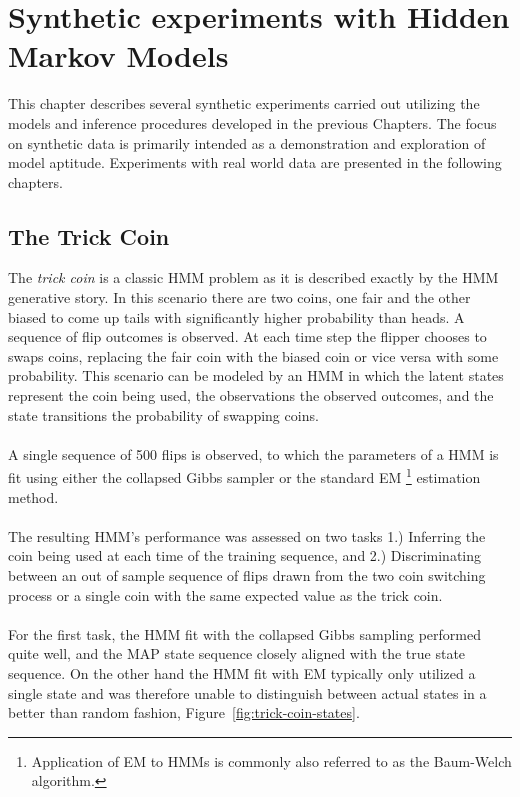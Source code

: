\documentclass[12pt]{report}
\newcommand{\1}[0]{\mathbbm{1}}
\begin{document}
\chapter{Synthetic experiments with Hidden Markov Models}
\label{chap:Synthetic experiments with Hidden Markov Model}
This chapter describes several synthetic experiments carried out utilizing the models and
inference procedures developed in the previous Chapters. The focus on synthetic data
is primarily intended as a demonstration and exploration of model aptitude. Experiments
with real world data are presented in the following chapters.

\section{The Trick Coin}
The \emph{trick coin} is a classic \ac{HMM} problem as it is described exactly
by the \ac{HMM} generative story. In this scenario there are two coins, one fair
and the other biased to come up tails with significantly higher probability than heads.
A sequence of flip outcomes is observed. At each time step the flipper chooses
to swaps coins, replacing the fair coin with the biased coin or vice versa with some probability.
This scenario can be modeled by an \ac{HMM} in which the latent
states represent the coin being used, the observations the observed outcomes, and
the state transitions the probability of swapping coins.
\\\\
A single sequence of 500 flips is observed, to which the parameters of a \ac{HMM} is fit using
either the collapsed Gibbs sampler or the standard \ac{EM}
\footnote{Application of \ac{EM} to \acp{HMM} is commonly also referred to as
the Baum-Welch algorithm.}
estimation method.
\\\\
The resulting \ac{HMM}'s performance was assessed on two tasks 1.) Inferring
the coin being used at each time of the training sequence, and 2.) Discriminating between an
out of sample sequence of flips drawn from the two coin switching process or a single coin with the
same expected value as the trick coin.
\\\\
For the first task, the \ac{HMM} fit with the collapsed Gibbs sampling performed quite well,
and the \ac{MAP} state sequence closely aligned with the true state sequence.
On the other hand the \ac{HMM} fit with \ac{EM} typically only utilized a single state
and was therefore unable to distinguish between actual states in a better than random fashion,
Figure~\ref{fig:trick-coin-states}.
\end{document}
